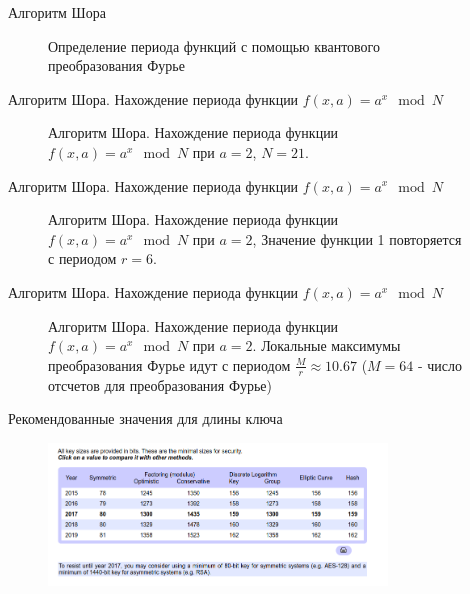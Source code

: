 \documentclass[10pt,pdf,hyperref={unicode}]{beamer}
\begin{document}
\begin{frame}{Алгоритм Шора}
\begin{figure}
\centering

\scalebox{.5}{}

\caption{ Определение периода функций с помощью квантового
  преобразования Фурье}
\end{figure}
\end{frame}


\begin{frame}{Алгоритм Шора. Нахождение периода функции 
  $f\left(x, a\right) = a^x \mod{N}$}
\begin{figure}
\centering

\scalebox{.5}{}

\caption{Алгоритм Шора. Нахождение периода функции 
  $f\left(x, a\right) = a^x \mod{N}$ при $a=2$, $N = 21$.}
\end{figure}
\end{frame}

\begin{frame}{Алгоритм Шора. Нахождение периода функции 
  $f\left(x, a\right) = a^x \mod{N}$}
\begin{figure}
\centering

\scalebox{.5}{}

\caption{Алгоритм Шора. Нахождение периода функции 
  $f\left(x, a\right) = a^x \mod{N}$ при $a=2$,  
  Значение функции 1 повторяется с периодом $r=6$.}
\end{figure}
\end{frame}

\begin{frame}{Алгоритм Шора. Нахождение периода функции 
  $f\left(x, a\right) = a^x \mod{N}$}
\begin{figure}
\centering

\scalebox{.5}{}

\caption{Алгоритм Шора. Нахождение периода функции 
  $f\left(x, a\right) = a^x \mod{N}$ при $a=2$. 
  Локальные максимумы преобразования Фурье 
  идут с периодом $\frac{M}{r} \approx 10.67$ ($M = 64$ - число отсчетов
  для преобразования Фурье)}
\end{figure}
\end{frame}

\begin{frame}{Рекомендованные значения для длины ключа}
 \begin{figure} 
   \includegraphics[width=90mm,scale=0.5]{keylengthcom.png}
  \end{figure}
\end{frame}
\end{document}
